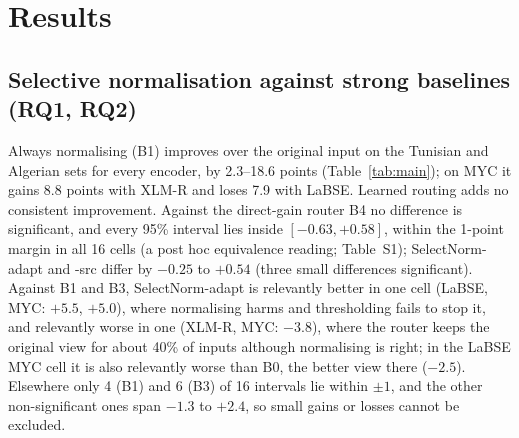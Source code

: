 \section{Results}
\label{sec:results}

\begin{table}[t]
\centering
\caption{Macro-F1 ($\lambda=0$, mean of five seeds), classifier trained on Arabic script only. Bold: best deployable system per column; shaded: SelectNorm-adapt (primary). $^{\triangledown}$/$^{\blacktriangle}$: baseline significantly worse/better than SelectNorm-adapt (paired bootstrap, Holm-corrected $p<0.05$ over 20 comparisons per encoder; tested for B0, B1, B3, B4, SelectNorm-src). $^\dagger$Two passes; $^\ddagger$uses test labels.}
\label{tab:main}
\footnotesize\setlength{\tabcolsep}{3.2pt}

\end{table}

\subsection{Selective normalisation against strong baselines (RQ1, RQ2)}
\label{sec:main-results}
Always normalising (B1) improves over the original input on the Tunisian and Algerian sets for every encoder, by 2.3--18.6 points (Table~\ref{tab:main}); on MYC it gains 8.8 points with XLM-R and loses 7.9 with LaBSE. Learned routing adds no consistent improvement. Against the direct-gain router B4 no difference is significant, and every 95\% interval lies inside $[-0.63,+0.58]$, within the 1-point margin in all 16 cells (a post hoc equivalence reading; Table~S1); SelectNorm-adapt and -src differ by $-0.25$ to $+0.54$ (three small differences significant). Against B1 and B3, SelectNorm-adapt is relevantly better in one cell (LaBSE, MYC: $+5.5$, $+5.0$), where normalising harms and thresholding fails to stop it, and relevantly worse in one (XLM-R, MYC: $-3.8$), where the router keeps the original view for about 40\% of inputs although normalising is right; in the LaBSE MYC cell it is also relevantly worse than B0, the better view there ($-2.5$). Elsewhere only 4 (B1) and 6 (B3) of 16 intervals lie within $\pm1$, and the other non-significant ones span $-1.3$ to $+2.4$, so small gains or losses cannot be excluded.

